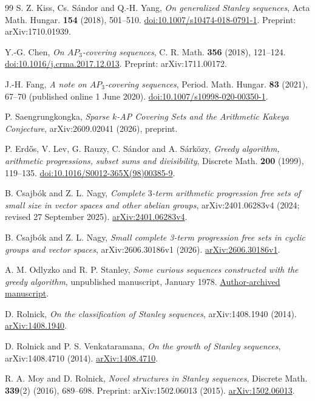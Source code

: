 \documentclass[11pt]{article}
\theoremstyle{definition}\newtheorem{definition}[theorem]{Definition}
\theoremstyle{remark}\newtheorem{remark}[theorem]{Remark}
\numberwithin{equation}{section}
\begin{document}
\begin{thebibliography}{99}\small
{}
S. Z. Kiss, Cs. S\'andor and Q.-H. Yang,
\emph{On generalized Stanley sequences},
Acta Math. Hungar. \textbf{154} (2018), 501--510.
\href{https://doi.org/10.1007/s10474-018-0791-1}{doi:10.1007/s10474-018-0791-1}.
Preprint: arXiv:1710.01939.

Y.-G. Chen,
\emph{On $AP_3$-covering sequences},
C. R. Math. \textbf{356} (2018), 121--124.
\href{https://doi.org/10.1016/j.crma.2017.12.013}{doi:10.1016/j.crma.2017.12.013}.
Preprint: arXiv:1711.00172.

J.-H. Fang,
\emph{A note on $AP_3$-covering sequences},
Period. Math. Hungar. \textbf{83} (2021), 67--70
(published online 1 June 2020).
\href{https://doi.org/10.1007/s10998-020-00350-1}{doi:10.1007/s10998-020-00350-1}.

P. Saengrungkongka,
\emph{Sparse $k$-AP Covering Sets and the Arithmetic Kakeya Conjecture},
arXiv:2609.02041 (2026), preprint.

P. Erd\H{o}s, V. Lev, G. Rauzy, C. S\'andor and A. S\'ark\"ozy,
\emph{Greedy algorithm, arithmetic progressions, subset sums and divisibility},
Discrete Math. \textbf{200} (1999), 119--135.
\href{https://doi.org/10.1016/S0012-365X(98)00385-9}{doi:10.1016/S0012-365X(98)00385-9}.

B. Csajb\'ok and Z. L. Nagy,
\emph{Complete $3$-term arithmetic progression free sets of small size in vector spaces and other abelian groups},
arXiv:2401.06283v4 (2024; revised 27 September 2025).
\href{https://arxiv.org/abs/2401.06283v4}{arXiv:2401.06283v4}.

B. Csajb\'ok and Z. L. Nagy,
\emph{Small complete 3-term progression free sets in cyclic groups and vector spaces},
arXiv:2606.30186v1 (2026).
\href{https://arxiv.org/abs/2606.30186v1}{arXiv:2606.30186v1}.

A. M. Odlyzko and R. P. Stanley,
\emph{Some curious sequences constructed with the greedy algorithm},
unpublished manuscript, January 1978.
\href{https://www.dtc.umn.edu/~odlyzko/unpublished/greedy.sequence.pdf}{Author-archived manuscript}.

D. Rolnick, \emph{On the classification of Stanley sequences},
arXiv:1408.1940 (2014).
\href{https://arxiv.org/abs/1408.1940}{arXiv:1408.1940}.

D. Rolnick and P. S. Venkataramana,
\emph{On the growth of Stanley sequences},
arXiv:1408.4710 (2014).
\href{https://arxiv.org/abs/1408.4710}{arXiv:1408.4710}.

R. A. Moy and D. Rolnick, \emph{Novel structures in Stanley sequences},
Discrete Math. \textbf{339}(2) (2016), 689--698. Preprint: arXiv:1502.06013 (2015).
\href{https://arxiv.org/abs/1502.06013}{arXiv:1502.06013}.
\end{thebibliography}
\end{document}
